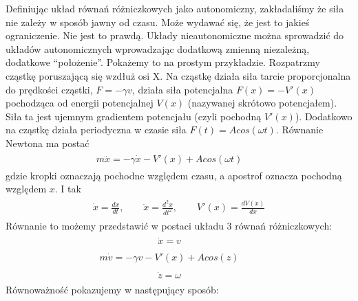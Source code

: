 \documentclass[a4paper,12pt,polish]{sphinxmanual}
\begin{document}
Definiując układ równań różniczkowych jako autonomiczny, zakładaliśmy że siła nie zależy w sposób jawny od czasu. Może wydawać się, że jest to jakieś ograniczenie. Nie jest to prawdą. Układy nieautonomiczne można sprowadzić do układów autonomicznych wprowadzając dodatkową zmienną niezależną, dodatkowe ``położenie''. Pokażemy to na prostym przykładzie. Rozpatrzmy cząstkę poruszającą się wzdłuż osi X. Na cząstkę działa siła tarcie proporcjonalna do prędkości cząstki, $F = -\gamma v$, działa siła potencjalna $F(x) = -V'(x)$ pochodząca od energii potencjalnej $V(x)$ (nazywanej skrótowo potencjałem). Siła ta jest ujemnym gradientem potencjału (czyli pochodną $V'(x)$). Dodatkowo na cząstkę działa periodyczna w czasie siła $F(t)  = A cos(\omega t)$. Równanie Newtona ma postać
\label{ch1/chI011:equation-eqn15}\begin{gather}
\begin{split}m\ddot x = -\gamma \dot x - V'(x) + A cos(\omega t) \qquad\end{split}\label{ch1/chI011-eqn15}
\end{gather}
gdzie kropki oznaczają pochodne względem czasu, a apostrof oznacza pochodną względem $x$. I tak
\label{ch1/chI011:equation-eqn16}\begin{gather}
\begin{split}\dot x = \frac{dx}{dt}, \qquad \ddot x = \frac{d^2x}{dt^2}, \qquad V'(x) = \frac{dV(x)}{dx}\end{split}\label{ch1/chI011-eqn16}
\end{gather}
Równanie to możemy przedstawić w postaci układu 3 równań różniczkowych:
\label{ch1/chI011:equation-eqn17}\begin{gather}
\begin{split}\dot x = v \qquad\end{split}\label{ch1/chI011-eqn17}
\end{gather}\label{ch1/chI011:equation-eqn18}\begin{gather}
\begin{split}m \dot v = -\gamma v -V'(x) + A cos (z)\qquad\end{split}\label{ch1/chI011-eqn18}
\end{gather}\label{ch1/chI011:equation-eqn19}\begin{gather}
\begin{split}\dot z = \omega\qquad\end{split}\label{ch1/chI011-eqn19}
\end{gather}
Równoważność  pokazujemy  w następujący sposób:
\end{document}
